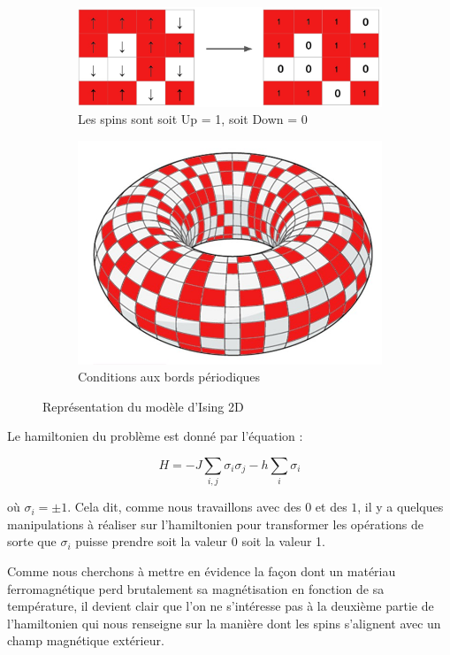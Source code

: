 \documentclass[11pt, parskip=half]{scrartcl} %
\begin{document}
\begin{figure}[h]
	\begin{subfigure}{0.5\textwidth}
		\centering
		\includegraphics[width=0.95\linewidth]{./figures/torus_left.jpg}
		\caption{Les spins sont soit Up = 1, soit Down = 0}
	\end{subfigure}
	\begin{subfigure}{0.5\textwidth}
		\centering
		\includegraphics[width=0.5\linewidth]{./figures/torus_right.jpg}
		\caption{Conditions aux bords périodiques}
	\end{subfigure}
	\caption{Représentation du modèle d'Ising 2D}
	\label{fig:ising2D}
\end{figure}


Le hamiltonien du problème est donné par l'équation :


\begin{equation*}
	H = -J  \displaystyle \sum_{i,j}\sigma_{i}\sigma_{j} - h\displaystyle \sum_{i} \sigma_{i}
\end{equation*}

où $\sigma_{i} = \pm 1$. Cela dit, comme nous travaillons avec des $0$ et des $1$, il y a quelques manipulations à réaliser sur l'hamiltonien pour transformer les opérations de sorte que $\sigma_{i}$ puisse prendre soit la valeur 0 soit la valeur 1.

Comme nous cherchons à mettre en évidence la façon dont un matériau ferromagnétique perd brutalement sa magnétisation en fonction de sa température, il devient clair que l'on ne s'intéresse pas à la deuxième partie de l'hamiltonien qui nous renseigne sur la manière dont les spins s'alignent avec un champ magnétique extérieur.
\end{document}
